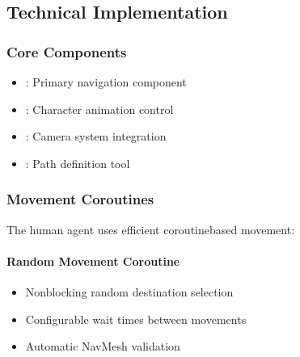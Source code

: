 \documentclass[letterpaper,10pt,english]{jupyterBook}
\begin{document}
\subsection{Technical Implementation}
\label{\detokenize{Human Agent:technical-implementation}}

\subsubsection{Core Components}
\label{\detokenize{Human Agent:core-components}}\begin{itemize}
\item {} 
\sphinxAtStartPar
{}: Primary navigation component

\item {} 
\sphinxAtStartPar
{}: Character animation control

\item {} 
\sphinxAtStartPar
{}: Camera system integration

\item {} 
\sphinxAtStartPar
{}: Path definition tool

\end{itemize}


\subsubsection{Movement Coroutines}
\label{\detokenize{Human Agent:movement-coroutines}}
\sphinxAtStartPar
The human agent uses efficient coroutine\sphinxhyphen{}based movement:


\paragraph{Random Movement Coroutine}
\label{\detokenize{Human Agent:random-movement-coroutine}}\begin{itemize}
\item {} 
\sphinxAtStartPar
Non\sphinxhyphen{}blocking random destination selection

\item {} 
\sphinxAtStartPar
Configurable wait times between movements

\item {} 
\sphinxAtStartPar
Automatic NavMesh validation

\end{itemize}
\end{document}
